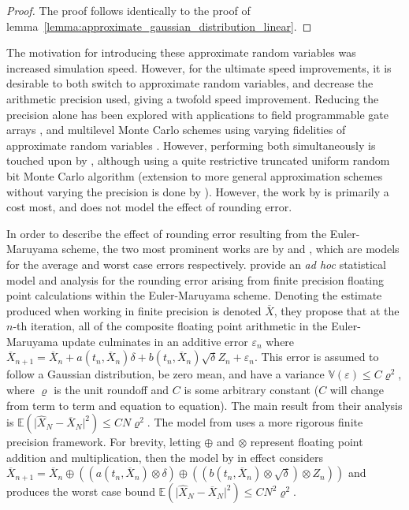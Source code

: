 \documentclass[manuscript,review]{acmart}
\begin{document}
\begin{proof}
The proof follows identically to the proof of lemma~\ref{lemma:approximate_gaussian_distribution_linear}.
\end{proof}

The motivation for introducing these approximate random variables was increased simulation speed. However, for the ultimate speed improvements, it is desirable to both switch to approximate random variables, and decrease the arithmetic precision used, giving a twofold speed improvement. Reducing the precision alone has been explored with applications to field programmable gate arrays  \citep{brugger2014mixed,omland2015exploiting,omland2016mixed,chow2012mixed}, and multilevel Monte Carlo schemes using varying fidelities of approximate random variables \citep{muller1958inverse}. However, performing both simultaneously is touched upon by \citet{giles2019random_multilevel}, although using a quite restrictive truncated uniform random bit Monte Carlo algorithm (extension to more general approximation schemes without varying the precision is done by \citet{giles2020approximate}). However, the work by \citet{giles2019random_multilevel} is primarily a cost most, and does not model the effect of rounding error. 


In order to describe the effect of rounding error resulting from the Euler-Maruyama scheme, the two most prominent works are by \citet{arciniega2003rounding} and \citet{omland2016mixed}, which are models for the average and worst case errors respectively. \citet{arciniega2003rounding} provide an \textit{ad hoc} statistical model and analysis for the rounding error arising from finite precision floating point calculations within the Euler-Maruyama scheme. Denoting the estimate produced when working in finite precision is denoted $ \overline{X} $, they propose that at the $ n $-th iteration, all of the composite floating point arithmetic in the Euler-Maruyama update culminates in an additive error $ \varepsilon_n $ where
$ \overline{X}_{n+1} = \overline{X}_n + a(t_n, \overline{X}_n) \delta + b(t_n, \overline{X}_n)\sqrt{\delta} Z_n + \varepsilon_n $.
This error is assumed to follow a Gaussian distribution, be zero mean, and have a variance $ \mathbb{V}(\varepsilon) \leq C \varrho^2 $, where $ \varrho $ is the unit roundoff and $ C $ is some arbitrary constant ($ C $ will change from term to term and equation to equation). The main result from their analysis \citep[theorem~2.2]{arciniega2003rounding} is $ \mathbb{E}(\lvert \widehat{X}_N - \overline{X}_N \rvert^2) \leq  CN\varrho^2 $. The model from \citet{omland2016mixed} uses a more rigorous finite precision framework. For brevity, letting $ \oplus $ and $ \otimes $ represent floating point addition and multiplication, then the model by \citet{omland2016mixed} in effect considers $ \overline{X}_{n+1} = \overline{X}_n \oplus ((a(t_n, \overline{X}_n) \otimes \delta) \oplus ((b(t_n, \overline{X}_n)\otimes \sqrt{\delta})\otimes Z_n)) $ and produces the worst case bound $ \mathbb{E}(\lvert \widehat{X}_N - \overline{X}_N \rvert^2) \leq  CN^2\varrho^2 $.
\end{document}
